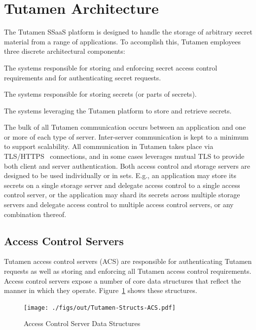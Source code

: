 \section{Tutamen Architecture}
\label{chap:tutamen:arch}

The Tutamen SSaaS platform is designed to handle the storage of
arbitrary secret material from a range of applications. To accomplish
this, Tutamen employees three discrete architectural components:

\begin{packed_desc}
\item[Access Control Servers (ACS):] The systems responsible for
  storing and enforcing secret access control requirements and for
  authenticating secret requests.
\item[Storage Servers (SS):] The systems responsible for storing
  secrets (or parts of secrets).
\item[Applications:] The systems leveraging the Tutamen platform to
  store and retrieve secrets.
\end{packed_desc}

The bulk of all Tutamen communication occurs between an application
and one or more of each type of server. Inter-server communication is
kept to a minimum to support scalability. All communication in Tutamen
takes place via TLS/HTTPS~\cite{dierks2008} connections, and in some
cases leverages mutual TLS to provide both client and server
authentication. Both access control and storage servers are designed
to be used individually or in sets. E.g., an application may store its
secrets on a single storage server and delegate access control to a
single access control server, or the application may shard its secrets
across multiple storage servers and delegate access control to
multiple access control servers, or any combination thereof.

\subsection{Access Control Servers}
\label{chap:tutamen:arch:acs}

Tutamen access control servers (ACS) are responsible for
authenticating Tutamen requests as well as storing and enforcing all
Tutamen access control requirements. Access control servers expose a
number of core data structures that reflect the manner in which they
operate. Figure~\ref{fig:tutamen:acstructs} shows these structures.

\begin{figure}[t]
  \centering
  \texttt{[image: ./figs/out/Tutamen-Structs-ACS.pdf]}
  \caption{Access Control Server Data Structures}
  \label{fig:tutamen:acstructs}
\end{figure}

